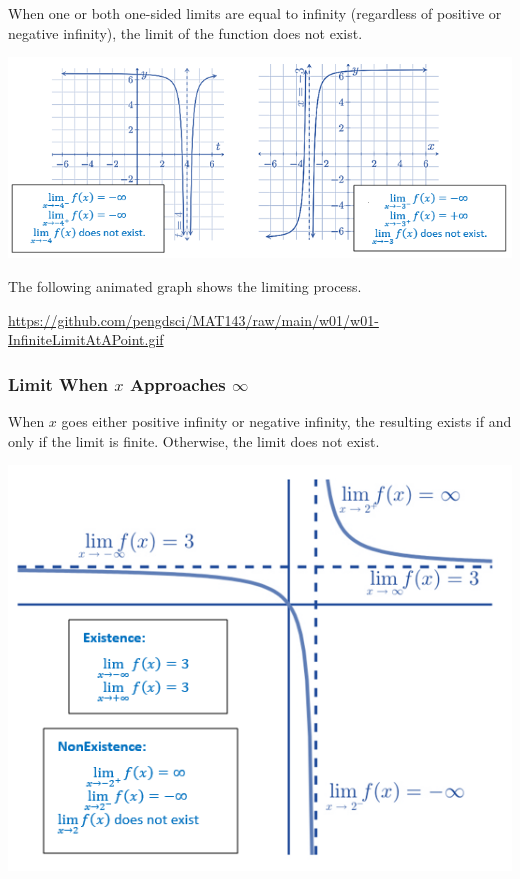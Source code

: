 \documentclass[
]{book}
\begin{document}
When one or both one-sided limits are equal to infinity (regardless of positive or negative infinity), the limit of the function does not exist.

\begin{center}\includegraphics[width=0.95\linewidth]{img01/w01note14-NonExistenceInfiniteLimits} \end{center}

\hfill\break

The following animated graph shows the limiting process.

\hfill\break

\url{https://github.com/pengdsci/MAT143/raw/main/w01/w01-InfiniteLimitAtAPoint.gif}

\hypertarget{limit-when-x-approaches-infty}{%
\subsubsection{\texorpdfstring{Limit When \(x\) Approaches \(\infty\)}{Limit When x Approaches \textbackslash infty}}\label{limit-when-x-approaches-infty}}

When \(x\) goes either positive infinity or negative infinity, the resulting exists if and only if the limit is finite. Otherwise, the limit does not exist.

\begin{center}\includegraphics[width=0.55\linewidth]{img01/w01note15-LimitsWinfinity} \end{center}
\end{document}
